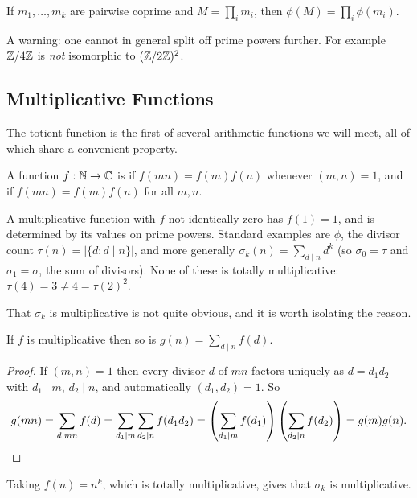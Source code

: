 \documentclass[a4paper]{scrartcl}
\begin{document}
\begin{corollary}\label{cor:phimult}
	If $m_1, \dots, m_k$ are pairwise coprime and $M = \prod_i m_i$, then $\phi(M) = \prod_i \phi(m_i)$.
\end{corollary}

\begin{remark}
	A warning: one cannot in general split off prime powers further. For example $\mathbb{Z}/4\mathbb{Z}$ is \emph{not} isomorphic to $(\mathbb{Z}/2\mathbb{Z})^2$.
\end{remark}

\subsection{Multiplicative Functions}

The totient function is the first of several arithmetic functions we will meet, all of which share a convenient property.

\begin{definition}
	A function $f : \mathbb{N} \to \mathbb{C}$ is  if $f(mn) = f(m)f(n)$ whenever $(m, n) = 1$, and  if $f(mn) = f(m)f(n)$ for all $m, n$.
\end{definition}

A multiplicative function with $f$ not identically zero has $f(1) = 1$, and is determined by its values on prime powers. Standard examples are $\phi$, the divisor count $\tau(n) = |\{d : d \mid n\}|$, and more generally $\sigma_k(n) = \sum_{d \mid n} d^k$ (so $\sigma_0 = \tau$ and $\sigma_1 = \sigma$, the sum of divisors). None of these is totally multiplicative: $\tau(4) = 3 \neq 4 = \tau(2)^2$.

That $\sigma_k$ is multiplicative is not quite obvious, and it is worth isolating the reason.

\begin{lemma}\label{lem:divsum}
	If $f$ is multiplicative then so is $g(n) = \sum_{d \mid n} f(d)$.
\end{lemma}
\begin{proof}
	If $(m, n) = 1$ then every divisor $d$ of $mn$ factors uniquely as $d = d_1 d_2$ with $d_1 \mid m$, $d_2 \mid n$, and automatically $(d_1, d_2) = 1$. So
	$$
	g(mn) = \sum_{d \mid mn} f(d) = \sum_{d_1 \mid m} \sum_{d_2 \mid n} f(d_1 d_2) = \left( \sum_{d_1 \mid m} f(d_1) \right) \left( \sum_{d_2 \mid n} f(d_2) \right) = g(m)g(n). \qedhere
	$$
\end{proof}

Taking $f(n) = n^k$, which is totally multiplicative, gives that $\sigma_k$ is multiplicative.
\end{document}
